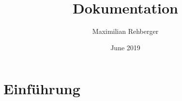 \documentclass{article}
\title{Dokumentation}
\author{Maximilian Rehberger}
\date{June 2019}
\begin{document}
\maketitle

\section{Einführung}
\end{document}
